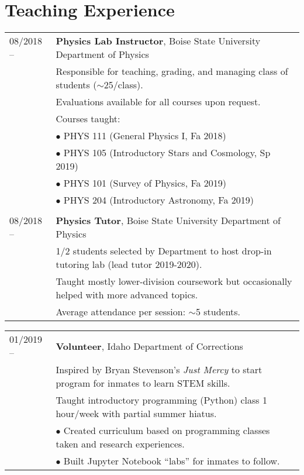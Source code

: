 \documentclass[11pt]{article}
\begin{document}
\section{Teaching Experience}
\begin{tabular}{ll}
08/2018 --		& 	\textbf{Physics Lab Instructor}, Boise State University Department of Physics \vspace{1mm} \\
      & Responsible for teaching, grading, and managing class of students ($\sim$25/class).\\
      & Evaluations available for all courses upon request. \vspace{2mm} \\
      & Courses taught:\\
      & $\bullet$ PHYS 111 (General Physics I, Fa 2018)\\
      & $\bullet$ PHYS 105 (Introductory Stars and Cosmology, Sp 2019)\\
      & $\bullet$ PHYS 101 (Survey of Physics, Fa 2019)\\
      & $\bullet$ PHYS 204 (Introductory Astronomy, Fa 2019)\\
      & \\
08/2018 --    &   \textbf{Physics Tutor}, Boise State University Department of Physics \vspace{1mm} \\
      & 1/2 students selected by Department to host drop-in tutoring lab (lead tutor 2019-2020).\\
      & Taught mostly lower-division coursework but occasionally helped with more advanced topics.\\
      & Average attendance per session: $\sim$5 students.\\

\end{tabular}
\newpage
\begin{tabular}{ll}
01/2019 --    &   \textbf{Volunteer}, Idaho Department of Corrections \\
      & Inspired by Bryan Stevenson's \textit{Just Mercy} to start program for inmates to learn STEM skills.\vspace{2mm} \\
      & Taught introductory programming (Python) class 1 hour/week with partial summer hiatus.\\
      & $\bullet$ Created curriculum based on programming classes taken and research experiences.\\
      & $\bullet$ Built Jupyter Notebook ``labs'' for inmates to follow.
\end{tabular}
\end{document}
